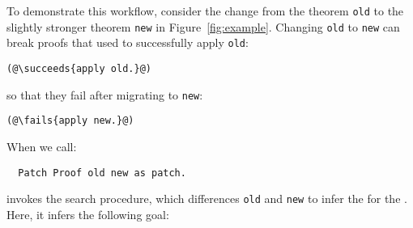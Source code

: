 \begin{figure*}
\begin{minipage}{0.50\textwidth}
\lstset{language=coq, aboveskip=0pt, belowskip=0pt}






\end{minipage}
\hfill
\begin{minipage}{0.50\textwidth}
\lstset{language=coq, aboveskip=0pt, belowskip=0pt}






\end{minipage}
\caption{Two proofs with different conclusions (top) and the
corresponding proof terms (bottom). Highlighted lines correspond to
the change in theorem conclusion (top) and the difference in terms that correspond to a patch (bottom).}
\label{fig:example}
\end{figure*}

To demonstrate this workflow, consider the change from the theorem \lstinline{old} to the slightly stronger theorem \lstinline{new} in Figure~\ref{fig:example}.
Changing \lstinline{old} to \lstinline{new} can break proofs that used to successfully apply \lstinline{old}:

\begin{lstlisting}[language=coq]
  (@\succeeds{apply old.}@)
\end{lstlisting}
so that they fail after migrating to \lstinline{new}:

\begin{lstlisting}[language=coq]
  (@\fails{apply new.}@)
\end{lstlisting}
When we call:

\begin{lstlisting}
  Patch Proof old new as patch.
\end{lstlisting}
\sysname invokes the search procedure, which differences \lstinline{old} and \lstinline{new} to infer the  for the .
Here, it infers the following goal:

